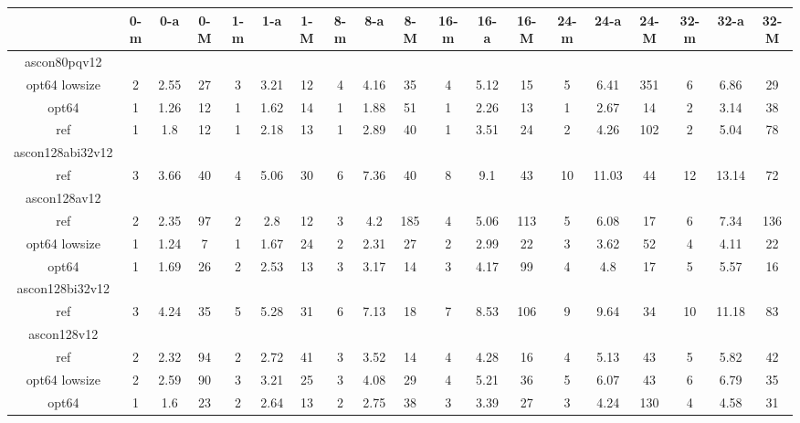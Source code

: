 \documentclass[12pt,a4paper,italian]{report}
\begin{document}
\begin{landscape}
    \begin{table}[]
        \begin{adjustbox}{width=600pt}
            \centering
			\begin{tabular}{|c|c|c|c|c|c|c|c|c|c|c|c|c|c|c|c|c|c|c|}
				\hline
				& 0-m & 0-a & 0-M & 1-m & 1-a & 1-M & 8-m & 8-a & 8-M & 16-m & 16-a & 16-M & 24-m & 24-a & 24-M & 32-m & 32-a & 32-M \\
				\hline
				ascon80pqv12 & & & & & & & & & & & & & & & & & & \\
				\hline
				opt64 lowsize & 2 & 2.55 & 27 & 3 & 3.21 & 12 & 4 & 4.16 & 35 & 4 & 5.12 & 15 & 5 & 6.41 & 351 & 6 & 6.86 & 29 \\
				\hline
				opt64 & 1 & 1.26 & 12 & 1 & 1.62 & 14 & 1 & 1.88 & 51 & 1 & 2.26 & 13 & 1 & 2.67 & 14 & 2 & 3.14 & 38 \\
				\hline
				ref & 1 & 1.8 & 12 & 1 & 2.18 & 13 & 1 & 2.89 & 40 & 1 & 3.51 & 24 & 2 & 4.26 & 102 & 2 & 5.04 & 78 \\
				\hline
				ascon128abi32v12 & & & & & & & & & & & & & & & & & & \\
				\hline
				ref & 3 & 3.66 & 40 & 4 & 5.06 & 30 & 6 & 7.36 & 40 & 8 & 9.1 & 43 & 10 & 11.03 & 44 & 12 & 13.14 & 72 \\
				\hline
				ascon128av12 & & & & & & & & & & & & & & & & & & \\
				\hline
				ref & 2 & 2.35 & 97 & 2 & 2.8 & 12 & 3 & 4.2 & 185 & 4 & 5.06 & 113 & 5 & 6.08 & 17 & 6 & 7.34 & 136 \\
				\hline
				opt64 lowsize & 1 & 1.24 & 7 & 1 & 1.67 & 24 & 2 & 2.31 & 27 & 2 & 2.99 & 22 & 3 & 3.62 & 52 & 4 & 4.11 & 22 \\
				\hline
				opt64 & 1 & 1.69 & 26 & 2 & 2.53 & 13 & 3 & 3.17 & 14 & 3 & 4.17 & 99 & 4 & 4.8 & 17 & 5 & 5.57 & 16 \\
				\hline
				ascon128bi32v12 & & & & & & & & & & & & & & & & & & \\
				\hline
				ref & 3 & 4.24 & 35 & 5 & 5.28 & 31 & 6 & 7.13 & 18 & 7 & 8.53 & 106 & 9 & 9.64 & 34 & 10 & 11.18 & 83 \\
				\hline
				ascon128v12 & & & & & & & & & & & & & & & & & & \\
				\hline
				ref & 2 & 2.32 & 94 & 2 & 2.72 & 41 & 3 & 3.52 & 14 & 4 & 4.28 & 16 & 4 & 5.13 & 43 & 5 & 5.82 & 42 \\
				\hline
				opt64 lowsize & 2 & 2.59 & 90 & 3 & 3.21 & 25 & 3 & 4.08 & 29 & 4 & 5.21 & 36 & 5 & 6.07 & 43 & 6 & 6.79 & 35 \\
				\hline
				opt64 & 1 & 1.6 & 23 & 2 & 2.64 & 13 & 2 & 2.75 & 38 & 3 & 3.39 & 27 & 3 & 4.24 & 130 & 4 & 4.58 & 31 \\
				\hline
			\end{tabular}
		\end{adjustbox}
	\end{table}
\end{landscape}
\end{document}
